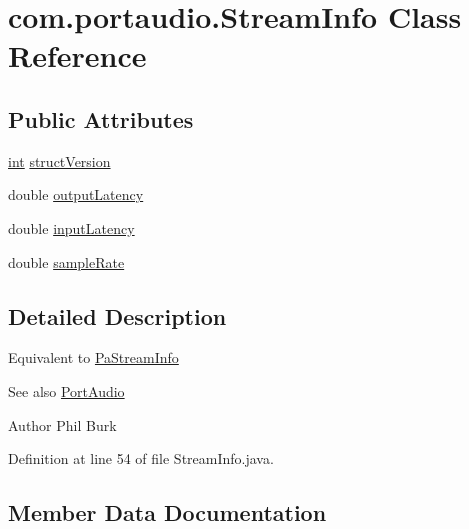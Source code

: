 \hypertarget{classcom_1_1portaudio_1_1_stream_info}{}\section{com.\+portaudio.\+Stream\+Info Class Reference}
\label{classcom_1_1portaudio_1_1_stream_info}
\subsection*{Public Attributes}
\begin{DoxyCompactItemize}
\item 
\hyperlink{xmltok_8h_a5a0d4a5641ce434f1d23533f2b2e6653}{int} \hyperlink{classcom_1_1portaudio_1_1_stream_info_a6da7fdf20fa3ea210576ca28ead9e1ca}{struct\+Version}
\item 
double \hyperlink{classcom_1_1portaudio_1_1_stream_info_a37a3420ed8708f6a534491ab47552c92}{output\+Latency}
\item 
double \hyperlink{classcom_1_1portaudio_1_1_stream_info_a99ed89ce6b1cd76ef843a40ce9bd043f}{input\+Latency}
\item 
double \hyperlink{classcom_1_1portaudio_1_1_stream_info_a30b6369d8eeb6a6e5195c4858d4d4281}{sample\+Rate}
\end{DoxyCompactItemize}


\subsection{Detailed Description}
Equivalent to \hyperlink{struct_pa_stream_info}{Pa\+Stream\+Info} \begin{DoxySeeAlso}{See also}
\hyperlink{classcom_1_1portaudio_1_1_port_audio}{Port\+Audio} 
\end{DoxySeeAlso}
\begin{DoxyAuthor}{Author}
Phil Burk 
\end{DoxyAuthor}


Definition at line 54 of file Stream\+Info.\+java.



\subsection{Member Data Documentation}
